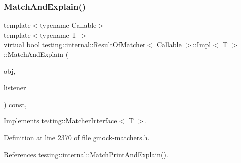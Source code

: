 \subsubsection{\texorpdfstring{Match\+And\+Explain()}{MatchAndExplain()}}
{\footnotesize\ttfamily template$<$typename Callable$>$ \\
template$<$typename T $>$ \\
virtual \hyperlink{classbool}{bool} \hyperlink{classtesting_1_1internal_1_1ResultOfMatcher}{testing\+::internal\+::\+Result\+Of\+Matcher}$<$ Callable $>$\+::\hyperlink{classtesting_1_1internal_1_1ResultOfMatcher_1_1Impl}{Impl}$<$ T $>$\+::Match\+And\+Explain (\begin{DoxyParamCaption}\item[{T}]{obj,  }\item[{\hyperlink{classtesting_1_1MatchResultListener}{Match\+Result\+Listener} $\ast$}]{listener }\end{DoxyParamCaption}) const\hspace{0.3cm}{\ttfamily [inline]}, {\ttfamily [virtual]}}



Implements \hyperlink{classtesting_1_1MatcherInterface_a296b43607cd99d60365f0e6a762777cf}{testing\+::\+Matcher\+Interface$<$ T $>$}.



Definition at line 2370 of file gmock-\/matchers.\+h.



References testing\+::internal\+::\+Match\+Print\+And\+Explain().


